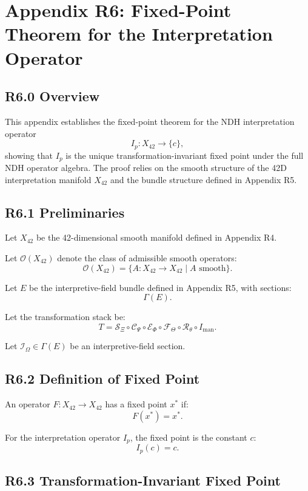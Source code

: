 \appendix
\section*{Appendix R6: Fixed-Point Theorem for the Interpretation Operator}

\subsection*{R6.0 Overview}

This appendix establishes the fixed-point theorem for the NDH
interpretation operator
\[
I_p : X_{42} \to \{c\},
\]
showing that $I_p$ is the unique transformation-invariant fixed point
under the full NDH operator algebra. The proof relies on the smooth
structure of the 42D interpretation manifold $X_{42}$ and the bundle
structure defined in Appendix R5.

\subsection*{R6.1 Preliminaries}

Let $X_{42}$ be the 42-dimensional smooth manifold defined in Appendix
R4.

Let $\mathcal{O}(X_{42})$ denote the class of admissible smooth
operators:
\[
\mathcal{O}(X_{42}) = \{ A : X_{42} \to X_{42} \mid A \text{ smooth} \}.
\]

Let $E$ be the interpretive-field bundle defined in Appendix R5, with
sections:
\[
\Gamma(E).
\]

Let the transformation stack be:
\[
T = 
\mathcal{S}_{\Xi} \circ
\mathcal{C}_{\Psi} \circ
\mathcal{E}_{\Phi} \circ
\mathcal{F}_{\Theta} \circ
\mathcal{R}_{\theta} \circ
I_{\mathrm{man}}.
\]

Let $\mathcal{I}_{\Omega} \in \Gamma(E)$ be an interpretive-field
section.

\subsection*{R6.2 Definition of Fixed Point}

An operator $F : X_{42} \to X_{42}$ has a fixed point $x^*$ if:
\[
F(x^*) = x^*.
\]

For the interpretation operator $I_p$, the fixed point is the constant
$c$:
\[
I_p(c) = c.
\]

\subsection*{R6.3 Transformation-Invariant Fixed Point}

